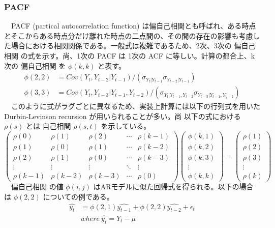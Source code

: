 \documentclass{scrartcl}
\begin{document}
\subsubsection{PACF}
\label{sec:org932d182}
　PACF (partical autocorrelation function) は偏自己相関とも呼ばれ、ある時点とそこからある時点分だけ離れた時点の二点間の、その間の存在の影響も考慮した場合における相関関係である。一般式は複雑であるため、2次、3次の 偏自己相関 の式を示す。尚、1次の PACF は 1次の ACF に等しい。計算の都合上、k次の 偏自己相関 を \(\phi(k, k)\) と表す。\\
\begin{align}
\phi(2, 2) &= Cov(Y_t,Y_{t-2}|Y_{t-1}) / (\sigma_{Y_t|Y_{t-1}} \sigma_{Y_{t-2}|Y_{t-1}}) \\
\phi(3, 3) &= Cov(Y_t,Y_{t-3}|Y_{t-1},Y_{t-2})/(\sigma_{Y_t|Y_{t-1},Y_{t-2}}\sigma_{Y_{t-3}|Y_{t-1},Y_{y-2}})
\end{align}
　このように式がラグごとに異なるため、実装上計算には以下の行列式を用いた Durbin-Levinson recursion が用いられることが多い。尚 以下の式における \(\rho(s)\) とは 自己相関 \(\rho(s, t)\) を示している。\\
\begin{equation}
\left(\begin{array}{ccccc}
\rho(0) & \rho(1) & \rho(2) & \cdots & \rho(k-1) \\
\rho(1) & \rho(0) & \rho(1) & \cdots & \rho(k-2) \\
\rho(2) & \rho(1) & \rho(0) & \cdots & \rho(k-3) \\ 
\vdots  & \vdots  & \vdots  & \ddots & \vdots \\
\rho(k-1) & \rho(k-2) & \rho(k-3) & \cdots & \rho(0)
\end{array}\right)\left(
\begin{array}{c}
\phi(k, 1) \\
\phi(k, 2) \\
\phi(k, 3) \\
\vdots \\
\phi(k, k) 
\end{array}\right)=\left(\begin{array}{c}
\rho(1) \\
\rho(2) \\
\rho(3) \\
\vdots \\
\rho(k) \end{array}\right)
\end{equation}
　偏自己相関 の値 \(\phi(i, j)\) はARモデルに似た回帰式を得られる。以下の場合は \(\phi(2,2)\) についての例である。\\
\begin{align}
\hat{y_t} &= \phi(2,1) \hat{y_{t-1}} + \phi(2,2)\hat{y_{t-2}} + \epsilon_t \nonumber \\
&where \ \hat{y_t} = Y_t - \mu 
\end{align}
\end{document}

